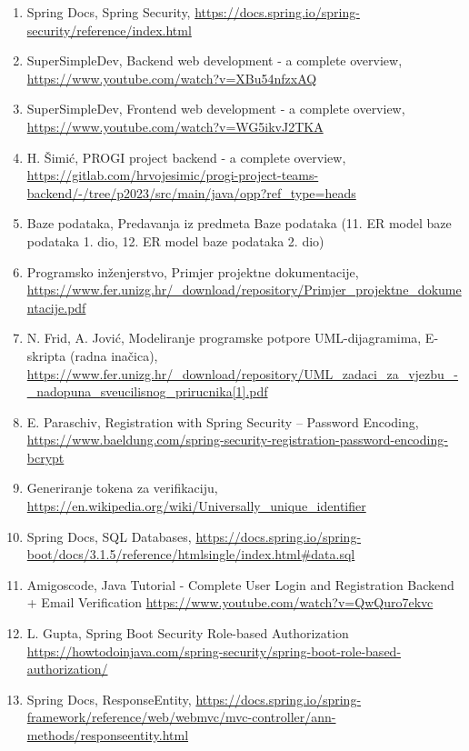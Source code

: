 \begin{enumerate}
			\item Spring Docs, Spring Security, 	\url{https://docs.spring.io/spring-security/reference/index.html}
			
			\item SuperSimpleDev, Backend web development - a complete overview,
			\url{https://www.youtube.com/watch?v=XBu54nfzxAQ}
			
			\item SuperSimpleDev, Frontend web development - a complete overview,
			\url{https://www.youtube.com/watch?v=WG5ikvJ2TKA}
			
			\item H. Šimić, PROGI project backend - a complete overview,
			\url{https://gitlab.com/hrvojesimic/progi-project-teams-backend/-/tree/p2023/src/main/java/opp?ref_type=heads}
			
			\item Baze podataka, Predavanja iz predmeta Baze podataka (11. ER model baze podataka 1. dio, 12. ER model baze podataka 2. dio)
			
			\item Programsko inženjerstvo, Primjer projektne dokumentacije, \url{https://www.fer.unizg.hr/_download/repository/Primjer_projektne_dokumentacije.pdf}
			
			\item N. Frid, A. Jović, Modeliranje programske potpore	UML-dijagramima, E-skripta (radna inačica), \url{https://www.fer.unizg.hr/_download/repository/UML_zadaci_za_vjezbu_-_nadopuna_sveucilisnog_prirucnika[1].pdf}
			
			\item E. Paraschiv, Registration with Spring Security – Password Encoding, \url{https://www.baeldung.com/spring-security-registration-password-encoding-bcrypt}
			
			\item Generiranje tokena za verifikaciju, \url{https://en.wikipedia.org/wiki/Universally_unique_identifier}
			
			\item Spring Docs, SQL Databases, \url{https://docs.spring.io/spring-boot/docs/3.1.5/reference/htmlsingle/index.html#data.sql}
			
			\item Amigoscode, Java Tutorial - Complete User Login and Registration Backend + Email Verification \url{https://www.youtube.com/watch?v=QwQuro7ekvc}
			
			\item L. Gupta, Spring Boot Security Role-based Authorization \url{https://howtodoinjava.com/spring-security/spring-boot-role-based-authorization/}
			
			\item Spring Docs, ResponseEntity,  \url{https://docs.spring.io/spring-framework/reference/web/webmvc/mvc-controller/ann-methods/responseentity.html}
		
		\end{enumerate}
		
		 